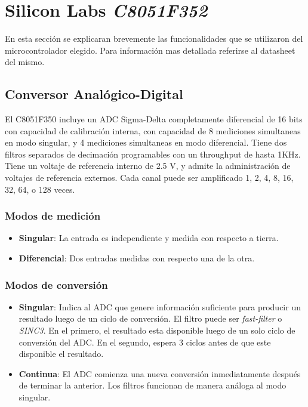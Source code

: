 \section{Silicon Labs \emph{C8051F352}} %
\label{sec:silicon_labs_c8051f352}

En esta secci\'on se explicaran brevemente las funcionalidades que se utilizaron del microcontrolador elegido. Para informaci\'on mas detallada referirse al datasheet del mismo. \cite{bib:datasheet}

\subsection{Conversor Anal\'ogico-Digital} %
\label{sub:conversor_analogico_digital}

El C8051F350 incluye un ADC Sigma-Delta completamente diferencial de 16 bits con capacidad de calibraci\'on interna, con capacidad de 8 mediciones simultaneas en modo singular, y 4 mediciones simultaneas en modo diferencial. Tiene dos filtros separados de decimaci\'on programables con un throughput de hasta 1KHz. Tiene un voltaje de referencia interno de 2.5 V, y admite la administraci\'on de voltajes de referencia externos. Cada canal puede ser amplificado 1, 2, 4, 8, 16, 32, 64, o 128 veces.

\subsubsection{Modos de medici\'on} %
\label{ssub:modos_de_medicion}

\begin{itemize}
  \item \textbf{Singular}: La entrada es independiente y medida con respecto a tierra.
  \item \textbf{Diferencial}: Dos entradas medidas con respecto una de la otra.
\end{itemize}

\subsubsection{Modos de conversi\'on} %
\label{ssub:modos_de_conversion}

\begin{itemize}
  \item \textbf{Singular}: Indica al ADC que genere informaci\'on suficiente para producir un resultado luego de un ciclo de conversi\'on. El filtro puede ser \emph{fast-filter} o \emph{SINC3}. En el primero, el resultado esta disponible luego de un solo ciclo de conversi\'on del ADC. En el segundo, espera 3 ciclos antes de que este disponible el resultado.
  \item \textbf{Continua}: El ADC comienza una nueva conversi\'on inmediatamente despu\'es de terminar la anterior. Los filtros funcionan de manera an\'aloga al modo singular.
\end{itemize}

